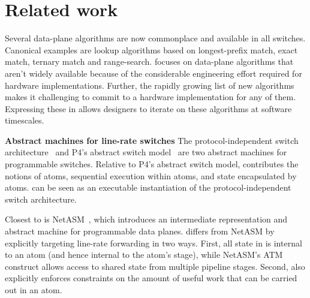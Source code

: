\section{Related work}
\label{s:related}

Several data-plane algorithms are now commonplace and available in all
switches. Canonical examples are lookup algorithms based on longest-prefix
match, exact match, ternary match and range-search. \pktlanguage focuses on
data-plane algorithms that aren't widely available because of the considerable
engineering effort required for hardware implementations. Further, the rapidly
growing list of new algorithms~\cite{pdq, d3, detail, codel, conga} makes it
challenging to commit to a hardware implementation for any of them.  Expressing
these in \pktlanguage allows designers to iterate on these algorithms at
software timescales.


\textbf{Abstract machines for line-rate switches}
The protocol-independent switch architecture~\cite{nick_p4} and P4's abstract
switch model~\cite{p4} are two abstract machines for programmable switches.
Relative to P4's abstract switch model, \absmachine contributes the notions of
atoms, sequential execution within atoms, and state encapsulated by atoms.
\absmachine can be seen as an executable instantiation of the
protocol-independent switch architecture.

Closest to \absmachine is NetASM~\cite{netasm}, which introduces an
intermediate representation and abstract machine for programmable data planes.
\absmachine differs from NetASM by explicitly targeting line-rate forwarding in
two ways.  First, all state in \absmachine is internal to an atom (and hence
internal to the atom's stage), while NetASM's ATM construct allows access to
shared state from multiple pipeline stages. Second, \absmachine also explicitly
enforces constraints on the amount of useful work that can be carried out in an
atom.

